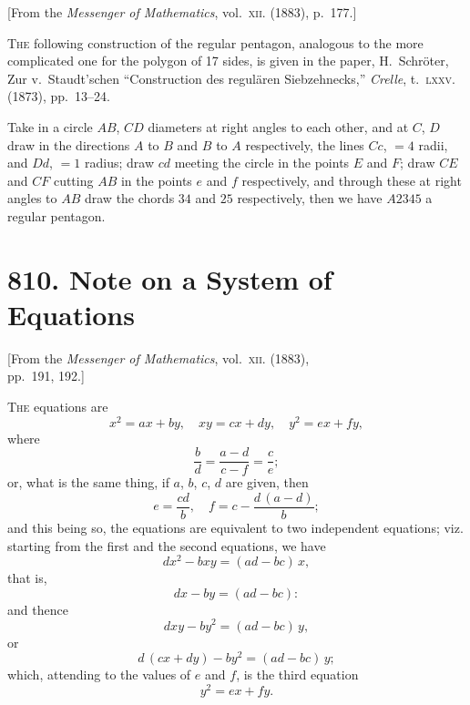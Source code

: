 \documentclass[11pt,a4paper]{article}
\theoremstyle{plain}
\theoremstyle{definition}
\theoremstyle{remark}
\begin{document}
\begin{center}
\small[From the \textit{Messenger of Mathematics}, vol.~\textsc{xii}. (1883), p.~177.]
\end{center}

\bigskip

\noindent
\textsc{The} following construction of the regular pentagon, analogous to the more complicated one for the polygon of 17 sides, is given in the paper, H.~Schr\"{o}ter, Zur v.~Staudt'schen ``Construction des regul\"{a}ren Siebzehnecks,'' \textit{Crelle}, t.~\textsc{lxxv.} (1873), pp.~13--24.

Take in a circle $AB$, $CD$ diameters at right angles to each other, and at $C$, $D$ draw in the directions $A$ to $B$ and $B$ to $A$ respectively, the lines $Cc$, $= 4$ radii, and $Dd$, $= 1$ radius; draw $cd$ meeting the circle in the points $E$ and $F$; draw $CE$ and $CF$ cutting $AB$ in the points $e$ and $f$ respectively, and through these at right angles to $AB$ draw the chords $34$ and $25$ respectively, then we have $A2345$ a regular pentagon.


\newpage
\section*{810. Note on a System of Equations}

\begin{center}
\small[From the \textit{Messenger of Mathematics}, vol.~\textsc{xii}. (1883),\\
pp.~191, 192.]
\end{center}

\bigskip

\noindent
\textsc{The} equations are
\[
x^2 = ax + by,\quad xy = cx + dy,\quad y^2 = ex + fy,
\]
where
\[
\frac{b}{d} = \frac{a-d}{c-f} = \frac{c}{e};
\]
or, what is the same thing, if $a$, $b$, $c$, $d$ are given, then
\[
e = \frac{cd}{b},\quad f = c - \frac{d\,(a-d)}{b};
\]
and this being so, the equations are equivalent to two independent equations; viz. starting from the first and the second equations, we have
\[
dx^2 - bxy = (ad-bc)\,x,
\]
that is,
\[
dx - by = (ad-bc):
\]
and thence
\[
dxy - by^2 = (ad-bc)\,y,
\]
or
\[
d\,(cx+dy) - by^2 = (ad-bc)\,y;
\]
which, attending to the values of $e$ and $f$, is the third equation
\[
y^2 = ex + fy.
\]
\end{document}
